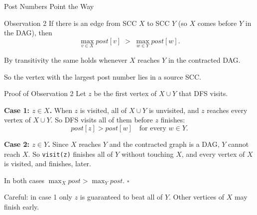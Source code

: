 \documentclass[10pt,aspectratio=169]{beamer}
\begin{document}
\begin{frame}{Post Numbers Point the Way}
  \begin{block}{Observation 2}
    If there is an edge from SCC $X$ to SCC $Y$ (so $X$ comes before $Y$ in
    the DAG), then
    \[
      \max_{v \in X} post[v] \;>\; \max_{w \in Y} post[w].
    \]
  \end{block}

  \bigskip
  By transitivity the same holds whenever $X$ reaches $Y$ in the contracted
  DAG.

  \pause
  \bigskip
  \begin{center}
    So the vertex with the \alert{largest} post number lies in a
    \alert{source} SCC.
  \end{center}
\end{frame}

\begin{frame}{Proof of Observation 2}
  Let $z$ be the first vertex of $X \cup Y$ that DFS visits.

  \pause
  \bigskip
  \textbf{Case 1: $z \in X$.} When $z$ is visited, all of $X \cup Y$ is
  unvisited, and $z$ reaches every vertex of $X \cup Y$. So DFS visits all of
  them before $z$ finishes:
  \[
    post[z] > post[w] \quad\text{for every } w \in Y.
  \]

  \pause
  \textbf{Case 2: $z \in Y$.} Since $X$ reaches $Y$ and the contracted graph
  is a DAG, $Y$ \alert{cannot} reach $X$. So \texttt{visit(z)} finishes all of
  $Y$ without touching $X$, and every vertex of $X$ is visited, and finishes,
  later.

  \pause
  \bigskip
  In both cases $\max_X post > \max_Y post$. $\square$

  \bigskip
  \small Careful: in case 1 only $z$ is guaranteed to beat all of $Y$. Other
  vertices of $X$ may finish early.
\end{frame}
\end{document}
